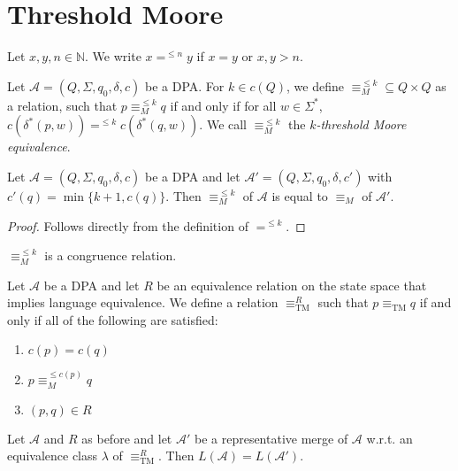 \section{Threshold Moore}
\begin{defn}
	Let $x, y, n \in \mathbb{N}$. We write $x =^{\leq n} y$ if $x = y$ or $x, y > n$.

	Let $\mathcal{A} = (Q, \Sigma, q_0, \delta, c)$ be a DPA. For $k \in c(Q)$, we define $\equiv_M^{\leq k} \subseteq Q \times Q$ as a relation, such that $p \equiv_M^{\leq k} q$ if and only if for all $w \in \Sigma^*$, $c(\delta^*(p, w)) =^{\leq k} c(\delta^*(q, w))$. We call $\equiv_M^{\leq k}$ the \emph{$k$-threshold Moore equivalence}.
\end{defn}

\begin{lem}
	Let $\mathcal{A} = (Q, \Sigma, q_0, \delta, c)$ be a DPA and let $\mathcal{A}' = (Q, \Sigma, q_0, \delta, c')$ with $c'(q) = \min \{k+1, c(q)\}$. Then $\equiv_M^{\leq k}$ of $\mathcal{A}$ is equal to $\equiv_M$ of $\mathcal{A}'$.
	\label{lem:tremoore:mleq_is_actually_just_moore}
\end{lem}

\begin{proof}
	Follows directly from the definition of $=^{\leq k}$.
\end{proof}

\begin{cor}
	$\equiv_M^{\leq k}$ is a congruence relation.
\end{cor}

\begin{defn}
	Let $\mathcal{A}$ be a DPA and let $R$ be an equivalence relation on the state space that implies language equivalence. We define a relation $\equiv_\text{TM}^R$ such that $p \equiv_\text{TM} q$ if and only if all of the following are satisfied:
	\begin{enumerate}
		\item $c(p) = c(q)$
		\item $p \equiv_M^{\leq c(p)} q$
		\item $(p, q) \in R$
	\end{enumerate}
\end{defn}

\begin{theorem}
	Let $\mathcal{A}$ and $R$ as before and let $\mathcal{A}'$ be a representative merge of $\mathcal{A}$ w.r.t. an equivalence class $\lambda$ of $\equiv_\text{TM}^R$. Then $L(\mathcal{A}) = L(\mathcal{A}')$.
\end{theorem}

